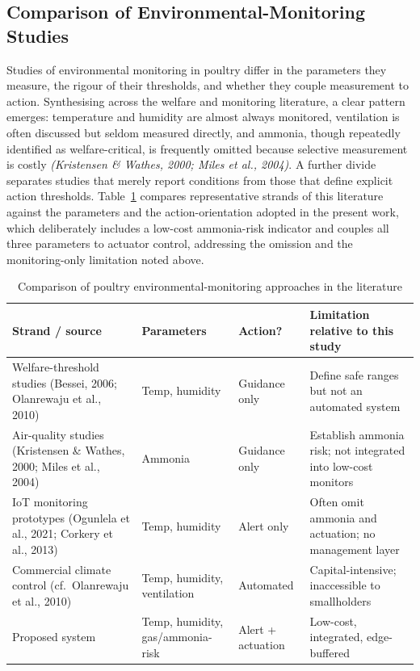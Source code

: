 \documentclass[12pt,a4paper]{report}
\begin{document}
\subsection{Comparison of Environmental-Monitoring Studies}

Studies of environmental monitoring in poultry differ in the parameters they measure, the rigour of their thresholds, and whether they couple measurement to action. Synthesising across the welfare and monitoring literature, a clear pattern emerges: temperature and humidity are almost always monitored, ventilation is often discussed but seldom measured directly, and ammonia, though repeatedly identified as welfare-critical, is frequently omitted because selective measurement is costly \textit{(Kristensen \& Wathes, 2000; Miles et al., 2004)}. A further divide separates studies that merely report conditions from those that define explicit action thresholds. Table~\ref{tab:envstudies} compares representative strands of this literature against the parameters and the action-orientation adopted in the present work, which deliberately includes a low-cost ammonia-risk indicator and couples all three parameters to actuator control, addressing the omission and the monitoring-only limitation noted above.

\begin{table}[tbp]
\caption{Comparison of poultry environmental-monitoring approaches in the literature}
\label{tab:envstudies}
\centering
\small
\begin{tabularx}{\textwidth}{|X|l|l|X|}
\hline
\rowcolor{headerblue}
\textbf{Strand / source} & \textbf{Parameters} & \textbf{Action?} & \textbf{Limitation relative to this study} \\
\hline
Welfare-threshold studies (Bessei, 2006; Olanrewaju et al., 2010) & Temp, humidity & Guidance only & Define safe ranges but not an automated system \\
\hline
Air-quality studies (Kristensen \& Wathes, 2000; Miles et al., 2004) & Ammonia & Guidance only & Establish ammonia risk; not integrated into low-cost monitors \\
\hline
IoT monitoring prototypes (Ogunlela et al., 2021; Corkery et al., 2013) & Temp, humidity & Alert only & Often omit ammonia and actuation; no management layer \\
\hline
Commercial climate control (cf.\ Olanrewaju et al., 2010) & Temp, humidity, ventilation & Automated & Capital-intensive; inaccessible to smallholders \\
\hline
Proposed system & Temp, humidity, gas/ammonia-risk & Alert + actuation & Low-cost, integrated, edge-buffered \\
\hline
\end{tabularx}
\end{table}
\end{document}
